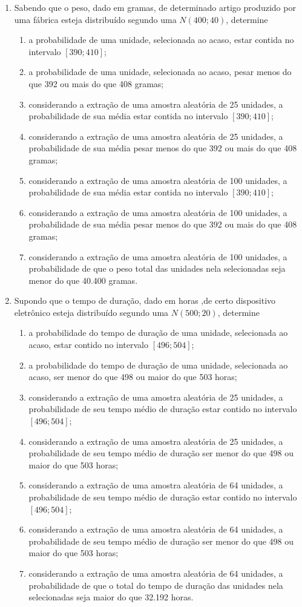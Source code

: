 \begin{enumerate}[resume]
\item Sabendo que o peso, dado em gramas, de determinado artigo produzido por uma fábrica esteja distribuído segundo uma $N(400 ; 40)$, determine
	\begin{enumerate}
	\item a probabilidade de uma unidade, selecionada ao acaso, estar contida no intervalo $[390 ; 410]$;
	\item a probabilidade de uma unidade, selecionada ao acaso, pesar menos do que 392 ou mais do que 408 gramas;
	\item considerando a extração de uma amostra aleatória de 25 unidades, a probabilidade de sua média estar contida no intervalo $[390 ;410]$;
	\item considerando a extração de uma amostra aleatória de 25 unidades, a probabilidade de sua média pesar menos do que 392 ou mais do que 408 gramas;
	\item considerando a extração de uma amostra aleatória de 100 unidades, a probabilidade de sua média estar contida no intervalo $[390 ;410]$;
	\item considerando a extração de uma amostra aleatória de 100 unidades, a probabilidade de sua média pesar menos do que 392 ou mais do que 408 gramas;
	\item considerando a extração de uma amostra aleatória de 100 unidades, a probabilidade de que o peso total das unidades nela selecionadas seja menor do que 40.400 gramas.
	\end{enumerate}

\item Supondo que o tempo de duração, dado em horas ,de certo dispositivo eletrônico esteja distribuído segundo uma $N(500 ; 20)$, determine
	\begin{enumerate}
	\item a probabilidade do tempo de duração de uma unidade, selecionada ao acaso, estar contido no intervalo $[496 ; 504]$;
	\item a probabilidade do tempo de duração de uma unidade, selecionada ao acaso, ser menor do que 498 ou maior do que 503 horas;
	\item considerando a extração de uma amostra aleatória de 25 unidades, a probabilidade de seu tempo médio de duração estar contido no intervalo $[496 ; 504]$;
	\item considerando a extração de uma amostra aleatória de 25 unidades, a probabilidade de seu tempo médio de duração ser menor do que 498 ou maior do que 503 horas;
	\item considerando a extração de uma amostra aleatória de 64 unidades, a probabilidade de seu tempo médio de duração estar contido no intervalo $[496 ; 504]$;
	\item considerando a extração de uma amostra aleatória de 64 unidades, a probabilidade de seu tempo médio de duração ser menor do que 498 ou maior do que 503 horas;
	\item considerando a extração de uma amostra aleatória de 64 unidades, a probabilidade de que o total do tempo de duração das unidades nela selecionadas seja maior do que 32.192 horas.
	\end{enumerate}														


\end{enumerate}

